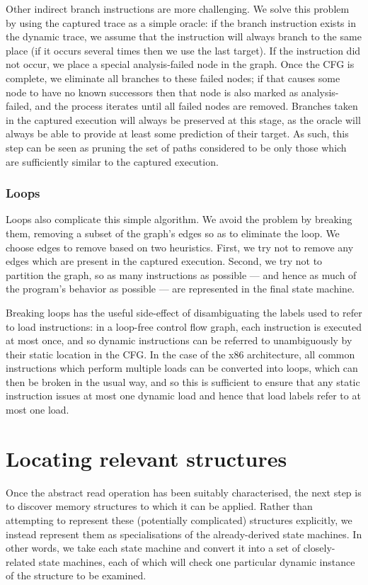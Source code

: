 \documentclass[10pt,letter,twocolumn]{sigplanconf}
\begin{document}
Other indirect branch instructions are more challenging.  We solve
this problem by using the captured trace as a simple oracle: if the
branch instruction exists in the dynamic trace, we assume that the
instruction will always branch to the same place (if it occurs several
times then we use the last target).  If the instruction did not occur,
we place a special analysis-failed node in the graph.  Once the CFG is
complete, we eliminate all branches to these failed nodes; if that
causes some node to have no known successors then that node is also
marked as analysis-failed, and the process iterates until all failed
nodes are removed.  Branches taken in the captured execution will
always be preserved at this stage, as the oracle will always be able
to provide at least some prediction of their target.  As such, this
step can be seen as pruning the set of paths considered to be only
those which are sufficiently similar to the captured execution.

\subsubsection{Loops}
\label{sect:loops}
Loops also complicate this simple algorithm.  We avoid the problem by
breaking them, removing a subset of the graph's edges so as to
eliminate the loop.  We choose edges to remove based on two
heuristics.  First, we try not to remove any edges which are present
in the captured execution.  Second, we try not to partition the graph,
so as many instructions as possible --- and hence as much of the
program's behavior as possible --- are represented in the final state
machine.

Breaking loops has the useful side-effect of disambiguating the labels
used to refer to load instructions: in a loop-free control flow graph,
each instruction is executed at most once, and so dynamic instructions
can be referred to unambiguously by their static location in the CFG.
In the case of the x86 architecture, all common instructions which
perform multiple loads can be converted into loops, which can then be
broken in the usual way, and so this is sufficient to ensure that any
static instruction issues at most one dynamic load and hence that load
labels refer to at most one load.

\section{Locating relevant structures}

Once the abstract read operation has been suitably characterised, the
next step is to discover memory structures to which it can be applied.
Rather than attempting to represent these (potentially complicated)
structures explicitly, we instead represent them as specialisations of
the already-derived state machines.  In other words, we take each
state machine and convert it into a set of closely-related state
machines, each of which will check one particular dynamic instance of
the structure to be examined.
\end{document}
